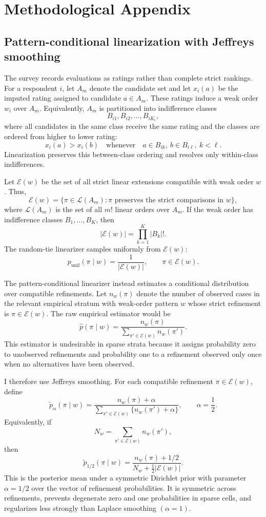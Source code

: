 \documentclass[12pt]{article}
\begin{document}
\section{Methodological Appendix}
\subsection{Pattern-conditional linearization with Jeffreys smoothing}
\label{app:pattern-linearization}

The survey records evaluations as ratings rather than complete strict rankings.
For a respondent \(i\), let \(A_m\) denote the candidate set and let
\(x_i(a)\) be the imputed rating assigned to candidate \(a\in A_m\). These
ratings induce a weak order \(w_i\) over \(A_m\). Equivalently, \(A_m\) is
partitioned into indifference classes
\[
B_{i1},B_{i2},\ldots,B_{iK_i},
\]
where all candidates in the same class receive the same rating and the classes
are ordered from higher to lower rating:
\[
x_i(a) > x_i(b)
\quad\text{whenever}\quad
a\in B_{ik},\ b\in B_{i\ell},\ k<\ell .
\]
Linearization preserves this between-class ordering and resolves only
within-class indifferences.

Let \(\mathcal E(w)\) be the set of all strict linear extensions compatible
with weak order \(w\). Thus,
\[
\mathcal E(w)
=
\{\pi\in \mathcal L(A_m): \pi \text{ preserves the strict comparisons in } w\},
\]
where \(\mathcal L(A_m)\) is the set of all \(m!\) linear orders over \(A_m\).
If the weak order has indifference classes \(B_1,\ldots,B_K\), then
\[
|\mathcal E(w)|=\prod_{k=1}^K |B_k|!.
\]
The random-tie linearizer samples uniformly from \(\mathcal E(w)\):
\[
p_{\mathrm{unif}}(\pi\mid w)
=
\frac{1}{|\mathcal E(w)|},
\qquad
\pi\in\mathcal E(w).
\]

The pattern-conditional linearizer instead estimates a conditional distribution
over compatible refinements. Let \(n_w(\pi)\) denote the number of observed
cases in the relevant empirical stratum with weak-order pattern \(w\) whose
strict refinement is \(\pi\in\mathcal E(w)\). The raw empirical estimator would
be
\[
\widehat p(\pi\mid w)
=
\frac{n_w(\pi)}
{\sum_{\pi'\in\mathcal E(w)}n_w(\pi')}.
\]
This estimator is undesirable in sparse strata because it assigns probability
zero to unobserved refinements and probability one to a refinement observed only
once when no alternatives have been observed.

I therefore use Jeffreys smoothing. For each compatible refinement
\(\pi\in\mathcal E(w)\), define
\[
\widetilde p_\alpha(\pi\mid w)
=
\frac{n_w(\pi)+\alpha}
{\sum_{\pi'\in\mathcal E(w)}\{n_w(\pi')+\alpha\}},
\qquad
\alpha=\frac12.
\]
Equivalently, if
\[
N_w=\sum_{\pi'\in\mathcal E(w)} n_w(\pi'),
\]
then
\[
\widetilde p_{1/2}(\pi\mid w)
=
\frac{n_w(\pi)+1/2}
{N_w+\frac12|\mathcal E(w)|}.
\]
This is the posterior mean under a symmetric Dirichlet prior with parameter
\(\alpha=1/2\) over the vector of refinement probabilities. It is symmetric
across refinements, prevents degenerate zero and one probabilities in sparse
cells, and regularizes less strongly than Laplace smoothing
\((\alpha=1)\).
\end{document}
